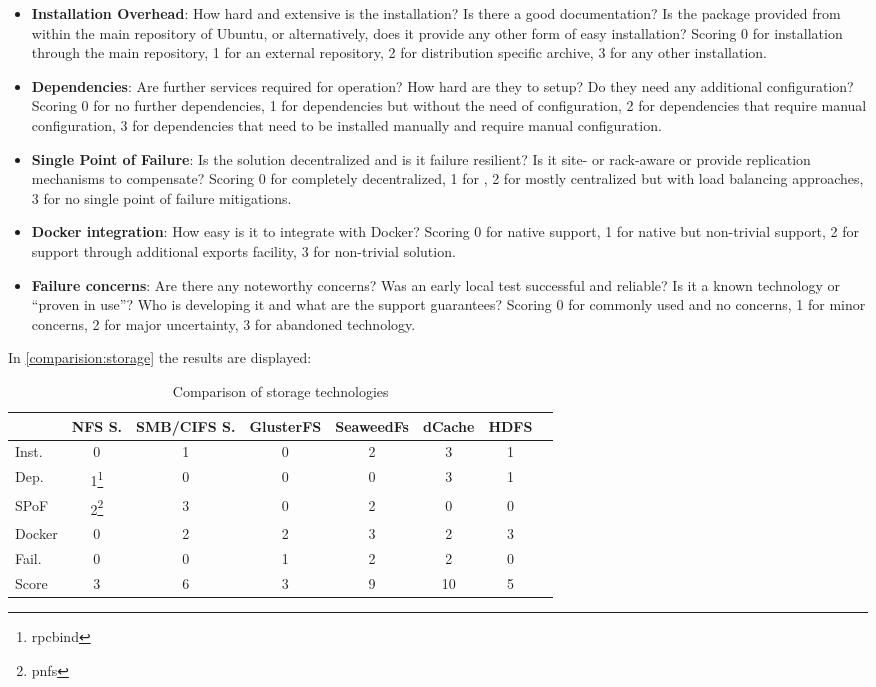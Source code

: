 \begin{itemize}
\item \textbf{Installation Overhead}:
How hard and extensive is the installation?
Is there a good documentation?
Is the package provided from within the main repository of Ubuntu, or alternatively, does it provide any other form of easy installation?
Scoring 0 for installation through the main repository, 1 for an external repository, 2 for distribution specific archive, 3 for any other installation.

\item \textbf{Dependencies}:
Are further services required for operation? 
How hard are they to setup?
Do they need any additional configuration?
Scoring 0 for no further dependencies, 1 for dependencies but without the need of configuration,  2 for dependencies that require manual configuration, 3 for dependencies that need to be installed manually and require manual configuration.

\item \textbf{Single Point of Failure}:
Is the solution decentralized and is it failure resilient?
Is it site- or rack-aware or provide replication mechanisms to compensate?
Scoring 0 for completely decentralized, 1 for , 2 for mostly centralized but with load balancing approaches, 3 for no single point of failure mitigations.

\item \textbf{Docker integration}:
How easy is it to integrate with Docker?
Scoring 0 for native support, 1 for native but non-trivial support, 2 for support through additional exports facility, 3 for non-trivial solution.

\item \textbf{Failure concerns}:
Are there any noteworthy concerns?
Was an early local test successful and reliable?
Is it a known technology or \enquote{proven in use}?
Who is developing it and what are the support guarantees?
Scoring 0 for commonly used and no concerns, 1 for minor concerns, 2 for major uncertainty, 3 for abandoned technology.
\end{itemize}

In \autoref{comparision:storage} the results are displayed:

\begin{table}[H]
	\begin{tabular}{l|c|c|c|c|c|c|c}
				& NFS S.& SMB/CIFS S.& GlusterFS & SeaweedFs	& dCache 	& HDFS \\
		\hline
		Inst. 	& 0 	& 1 		& 0 		& 2 		& 3			& 1 \\
		Dep. 	& 1\footnote{rpcbind} & 0 & 0 	& 0 		& 3 		& 1 \\
		SPoF 	& 2\footnote{pnfs} 	& 3 		& 0 		& 2 		& 0			& 0 \\
		Docker 	& 0 	& 2 		& 2 		& 3 		& 2 		& 3 \\
		Fail.	& 0		& 0			& 1			& 2			& 2			& 0 \\
		\hline
		Score 	& 3		& 6			& 3			& 9 		& 10		& 5 \\
	\end{tabular}
	\caption{Comparison of storage technologies}
	\label{comparision:storage}
\end{table}

